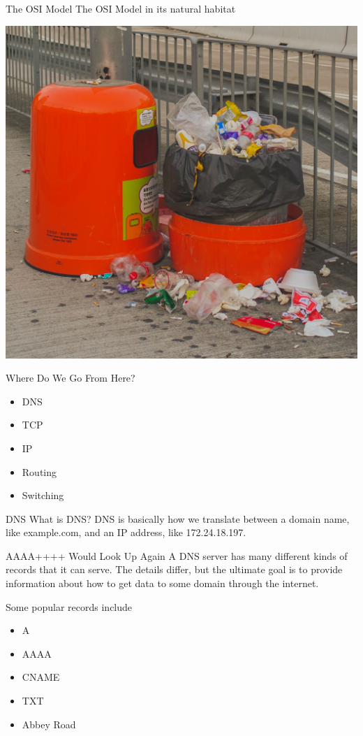 \documentclass[presentation]{beamer}
\begin{document}
\begin{frame}[label={sec:orgb7e5b3a}]{The OSI Model}
The OSI Model in its natural habitat

\begin{center}
\includegraphics[height=0.8\textheight]{./garbage.jpg}
\end{center}
\end{frame}

\begin{frame}[label={sec:org2366317}]{Where Do We Go From Here?}
\begin{itemize}
\item DNS
\item TCP
\item IP
\item Routing
\item Switching
\end{itemize}
\end{frame}

\begin{frame}[label={sec:orgb3c6200}]{DNS}
What is DNS?
\pause
DNS is basically how we translate between a domain name, like
example.com, and an IP address, like 172.24.18.197.
\end{frame}

\begin{frame}[label={sec:org34ba428}]{AAAA++++ Would Look Up Again}
A DNS server has many different kinds of records that it can
serve. The details differ, but the ultimate goal is to provide
information about how to get data to some domain through the internet.

\pause
Some popular records include

\begin{itemize}
\item A
\item AAAA
\item CNAME
\item TXT
\item Abbey Road
\end{itemize}
\end{frame}
\end{document}

